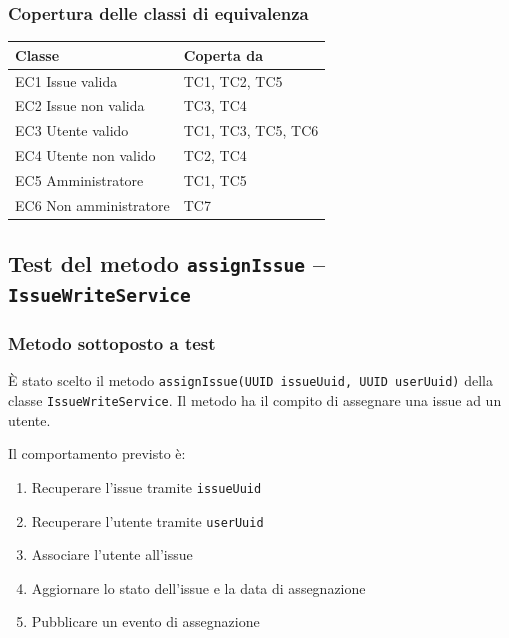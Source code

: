 \documentclass[a4paper,12pt]{article}
\begin{document}
\subsubsection{Copertura delle classi di equivalenza}

\begin{longtable}{|p{5cm}|p{9cm}|}
\hline
\textbf{Classe} & \textbf{Coperta da} \\ \hline
EC1 Issue valida & TC1, TC2, TC5 \\ \hline
EC2 Issue non valida & TC3, TC4 \\ \hline
EC3 Utente valido & TC1, TC3, TC5, TC6 \\ \hline
EC4 Utente non valido & TC2, TC4 \\ \hline
EC5 Amministratore & TC1, TC5 \\ \hline
EC6 Non amministratore & TC7 \\ \hline
\end{longtable}



\subsection{Test del metodo \texttt{assignIssue} -- \texttt{IssueWriteService}}
\label{sec:testAssignIssueDoc}

\subsubsection{Metodo sottoposto a test}
È stato scelto il metodo \texttt{assignIssue(UUID issueUuid, UUID userUuid)} della classe \texttt{IssueWriteService}. Il metodo ha il compito di assegnare una issue ad un utente.

Il comportamento previsto è:
\begin{enumerate}
    \item Recuperare l'issue tramite \texttt{issueUuid}
    \item Recuperare l'utente tramite \texttt{userUuid}
    \item Associare l'utente all'issue
    \item Aggiornare lo stato dell'issue e la data di assegnazione
    \item Pubblicare un evento di assegnazione
\end{enumerate}
\end{document}
